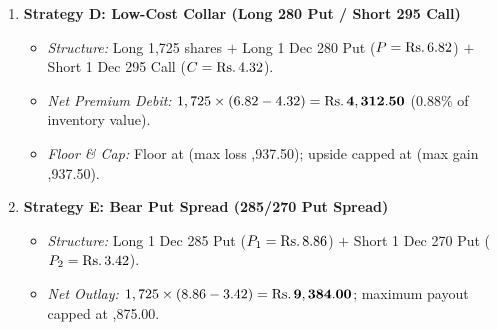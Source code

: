 \begin{enumerate}[leftmargin=1.5em, itemsep=1.5pt, parsep=0pt, label=\textbf{\arabic*.}]
    \item \textbf{Strategy D: Low-Cost Collar (Long 280 Put / Short 295 Call)}
    \begin{itemize}[leftmargin=1.2em, itemsep=0.5pt, parsep=0pt]
        \item \textit{Structure:} Long 1,725 shares $+$ Long 1 Dec 280 Put ($P = \text{\text{Rs.}\,}6.82$) $+$ Short 1 Dec 295 Call ($C = \text{\text{Rs.}\,}4.32$).
        \item \textit{Net Premium Debit:} $1,725 \times (6.82 - 4.32) = \mathbf{\text{\text{Rs.}\,}4,312.50}$ ($0.88\%$ of inventory value).
        \item \textit{Floor \& Cap:} Floor at  (max loss ,937.50); upside capped at  (max gain ,937.50).
    \end{itemize}
    \item \textbf{Strategy E: Bear Put Spread (285/270 Put Spread)}
    \begin{itemize}[leftmargin=1.2em, itemsep=0.5pt, parsep=0pt]
        \item \textit{Structure:} Long 1 Dec 285 Put ($P_1 = \text{\text{Rs.}\,}8.86$) $+$ Short 1 Dec 270 Put ($P_2 = \text{\text{Rs.}\,}3.42$).
        \item \textit{Net Outlay:} $1,725 \times (8.86 - 3.42) = \mathbf{\text{\text{Rs.}\,}9,384.00}$; maximum payout capped at ,875.00.
    \end{itemize}
\end{enumerate}

\clearpage
